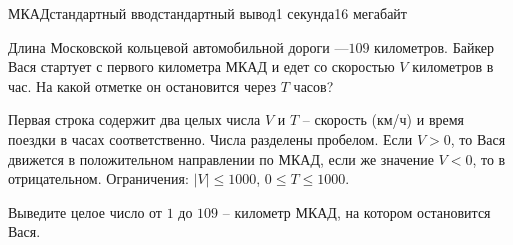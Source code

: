\begin{problem}{МКАД}{стандартный ввод}{стандартный вывод}{1 секунда}{16 мегабайт}

Длина Московской кольцевой автомобильной дороги ---$109$ километров. Байкер Вася стартует с первого километра МКАД и едет со скоростью $V$ километров в час. На какой отметке он остановится через $T$ часов?

\InputFile
Первая строка содержит два целых числа $V$ и $T$ -- скорость (км/ч) и время поездки в часах соответственно. Числа разделены пробелом. Если $V>0$, то Вася движется в положительном направлении по МКАД, если же значение $V<0$, то в отрицательном. Ограничения: $|V| \leq 1000$, $0 \leq T \leq 1000$.

\OutputFile
Выведите целое число от $1$ до $109$ -- километр МКАД, на котором остановится Вася.

\Examples

\begin{example}
%
%
\end{example}

\end{problem}

